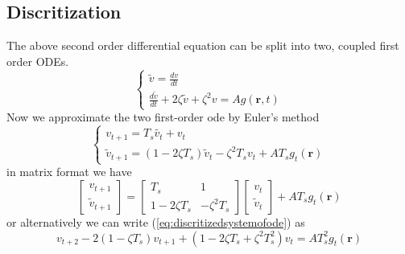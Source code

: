 \documentclass[a4paper,10pt]{article}
\begin{document}
\subsection*{Discritization}
The above second order differential equation can be split into two, coupled first order ODEs.\\
\begin{equation}\label{eq:systemofode}
\begin{cases}
\tilde{v}=\frac{dv}{dt} \\
\frac{d\tilde{v}}{dt}+2\zeta\tilde{v}+\zeta^2v=Ag\left( \mathbf{r},t \right)
\end{cases}
\end{equation}
Now we approximate the two first-order ode by Euler's method
\begin{equation}\label{eq:discritizedsystemofode}
\begin{cases}
v_{t+1}=T_s\tilde{v_t}+v_t\\
\tilde{v}_{t+1}=(1-2\zeta T_s)\tilde{v}_t-\zeta^2T_sv_t+AT_sg_t\left( \mathbf{r}\right)
\end{cases}
\end{equation}
in matrix format we have
\begin{equation}
 \begin{bmatrix}v_{t+1} \\ \tilde{v}_{t+1}\end{bmatrix}= \begin{bmatrix} T_s &1\\ 1-2\zeta T_s & -\zeta^2T_s\end{bmatrix}\begin{bmatrix}v_{t} \\ \tilde{v}_{t}\end{bmatrix}+AT_sg_t\left( \mathbf{r}\right)
\end{equation}
or alternatively we can write (\ref{eq:discritizedsystemofode}) as
\begin{equation}\label{eq:DifferenceModel}
 v_{t+2}-2(1-\zeta T_s)v_{t+1}+(1-2\zeta T_s+\zeta^2T_s^2)v_t=AT_s^2g_t\left( \mathbf{r}\right)
\end{equation}
\end{document}
